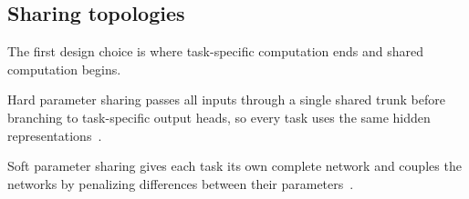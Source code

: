 \subsection{Sharing topologies}

The first design choice is where task-specific computation ends and shared
computation begins.

\begin{definition}\label{def:fund:hard}
Hard parameter sharing passes all inputs through a single shared trunk before
branching to task-specific output heads, so every task uses the same hidden
representations~\cite{ruder2017mtloverview}.
\end{definition}

\begin{definition}\label{def:fund:soft}
Soft parameter sharing gives each task its own complete network and couples the
networks by penalizing differences between their
parameters~\cite{ruder2017mtloverview}.
\end{definition}


